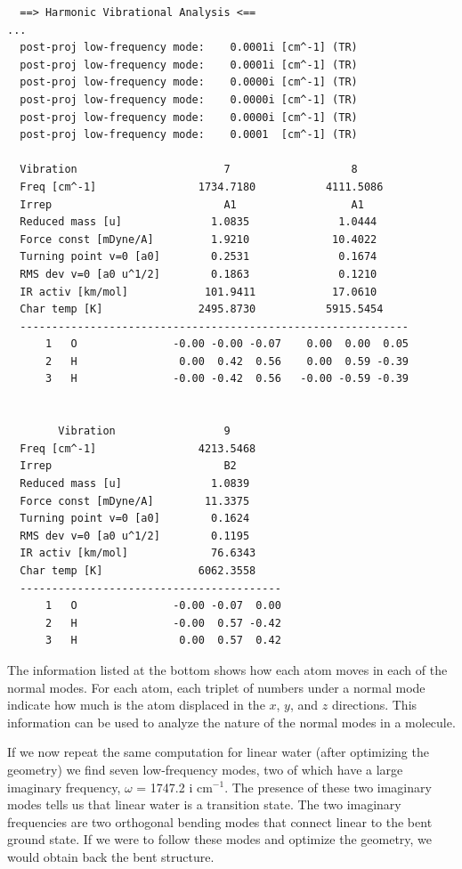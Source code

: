 \documentclass[../Main/notes.tex]{subfiles}
\begin{document}
\begin{small}
\begin{verbatim}
  ==> Harmonic Vibrational Analysis <==
...
  post-proj low-frequency mode:    0.0001i [cm^-1] (TR)
  post-proj low-frequency mode:    0.0001i [cm^-1] (TR)
  post-proj low-frequency mode:    0.0000i [cm^-1] (TR)
  post-proj low-frequency mode:    0.0000i [cm^-1] (TR)
  post-proj low-frequency mode:    0.0000i [cm^-1] (TR)
  post-proj low-frequency mode:    0.0001  [cm^-1] (TR)

  Vibration                       7                   8
  Freq [cm^-1]                1734.7180           4111.5086
  Irrep                           A1                  A1
  Reduced mass [u]              1.0835              1.0444
  Force const [mDyne/A]         1.9210             10.4022
  Turning point v=0 [a0]        0.2531              0.1674
  RMS dev v=0 [a0 u^1/2]        0.1863              0.1210
  IR activ [km/mol]            101.9411            17.0610
  Char temp [K]               2495.8730           5915.5454
  -------------------------------------------------------------
      1   O               -0.00 -0.00 -0.07    0.00  0.00  0.05
      2   H                0.00  0.42  0.56    0.00  0.59 -0.39
      3   H               -0.00 -0.42  0.56   -0.00 -0.59 -0.39
      
      
        Vibration                 9           
  Freq [cm^-1]                4213.5468       
  Irrep                           B2          
  Reduced mass [u]              1.0839        
  Force const [mDyne/A]        11.3375        
  Turning point v=0 [a0]        0.1624        
  RMS dev v=0 [a0 u^1/2]        0.1195        
  IR activ [km/mol]             76.6343        
  Char temp [K]               6062.3558       
  -----------------------------------------
      1   O               -0.00 -0.07  0.00   
      2   H               -0.00  0.57 -0.42   
      3   H                0.00  0.57  0.42   
\end{verbatim}
\end{small}

The information listed at the bottom shows how each atom moves in each of the normal modes.
For each atom, each triplet of numbers under a normal mode indicate how much is the atom displaced in the $x$, $y$, and $z$ directions.
This information can be used to analyze the nature of the normal modes in a molecule.

If we now repeat the same computation for linear water (after optimizing the geometry) we find seven low-frequency modes, two of which have a large imaginary frequency, $\omega$ = 1747.2 i cm$^{-1}$.
The presence of these two imaginary modes tells us that linear water is a transition state.
The two imaginary frequencies are two orthogonal bending modes that connect linear  to the bent ground state.
If we were to follow these modes and optimize the geometry, we would obtain back the bent structure.
\end{document}
